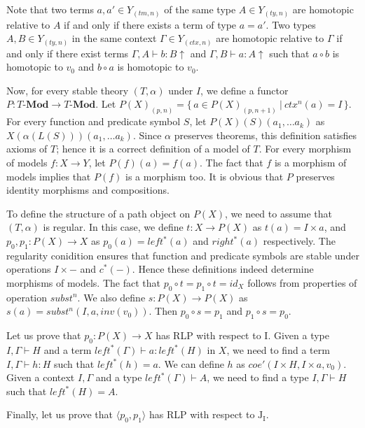 \documentclass[reqno]{amsart}
\theoremstyle{definition}
\theoremstyle{remark}
\newcommand{\cat}[1]{\mathbf{#1}}
\newcommand{\Mod}[1]{#1\text{-}\cat{Mod}}
\newcommand{\I}{\mathrm{I}}
\newcommand{\J}{\mathrm{J}}
\numberwithin{figure}{section}
\begin{document}
Note that two terms $a,a' \in Y_{(tm,n)}$ of the same type $A \in Y_{(ty,n)}$ are homotopic relative to $A$
if and only if there exists a term of type $a = a'$.
Two types $A,B \in Y_{(ty,n)}$ in the same context $\Gamma \in Y_{(ctx,n)}$ are homotopic relative to $\Gamma$
if and only if there exist terms $\Gamma, A \vdash b : B\!\!\uparrow$ and $\Gamma, B \vdash a : A\!\!\uparrow$
such that $a \circ b$ is homotopic to $v_0$ and $b \circ a$ is homotopic to $v_0$.

Now, for every stable theory $(T,\alpha)$ under $I$, we define a functor $P : \Mod{T} \to \Mod{T}$.
Let $P(X)_{(p,n)} = \{\,a \in P(X)_{(p,n+1)}\ |\ ctx^n(a) = I\,\}$.
For every function and predicate symbol $S$, let $P(X)(S)(a_1, \ldots a_k)$ as $X(\alpha(L(S)))(a_1, \ldots a_k)$.
Since $\alpha$ preserves theorems, this definition satisfies axioms of $T$; hence it is a correct definition of a model of $T$.
For every morphism of models $f : X \to Y$, let $P(f)(a) = f(a)$.
The fact that $f$ is a morphism of models implies that $P(f)$ is a morphism too.
It is obvious that $P$ preserves identity morphisms and compositions.

To define the structure of a path object on $P(X)$, we need to assume that $(T,\alpha)$ is regular.
In this case, we define $t : X \to P(X)$ as $t(a) = I \times a$, and $p_0,p_1 : P(X) \to X$ as $p_0(a) = left^*(a)$ and $right^*(a)$ respectively.
The regularity conidition ensures that function and predicate symbols are stable under operations $I \times -$ and $c^*(-)$.
Hence these definitions indeed determine morphisms of models.
The fact that $p_0 \circ t = p_1 \circ t = id_X$ follows from properties of operation $subst^n$.
We also define $s : P(X) \to P(X)$ as $s(a) = subst^n(I, a, inv(v_0))$.
Then $p_0 \circ s = p_1$ and $p_1 \circ s = p_0$.

Let us prove that $p_0 : P(X) \to X$ has RLP with respect to $\I$.
Given a type $I, \Gamma \vdash H$ and a term $left^*(\Gamma) \vdash a : left^*(H)$ in $X$,
we need to find a term $I, \Gamma \vdash h : H$ such that $left^*(h) = a$.
We can define $h$ as $coe'(I \times H, I \times a, v_0)$.
Given a context $I, \Gamma$ and a type $left^*(\Gamma) \vdash A$,
we need to find a type $I, \Gamma \vdash H$ such that $left^*(H) = A$.

Finally, let us prove that $\langle p_0, p_1 \rangle$ has RLP with respect to $\J_\I$.

\end{document}
